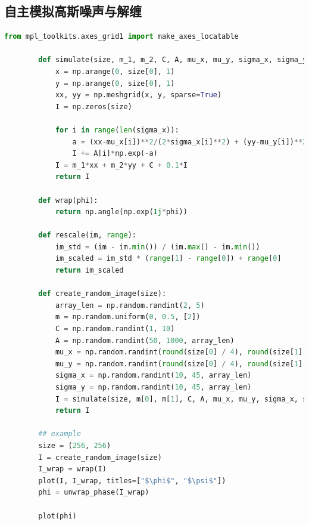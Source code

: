 \documentclass[a4paper]{article}
\begin{document}
	\subsection{自主模拟高斯噪声与解缠}
	\begin{lstlisting}[language=python,columns=fullflexible,frame=shadowbox]
		from mpl_toolkits.axes_grid1 import make_axes_locatable

		def simulate(size, m_1, m_2, C, A, mu_x, mu_y, sigma_x, sigma_y):
			x = np.arange(0, size[0], 1)
			y = np.arange(0, size[0], 1)
			xx, yy = np.meshgrid(x, y, sparse=True)
			I = np.zeros(size)
	
			for i in range(len(sigma_x)):
				a = (xx-mu_x[i])**2/(2*sigma_x[i]**2) + (yy-mu_y[i])**2/(2*sigma_y[i]**2)
				I += A[i]*np.exp(-a)
			I = m_1*xx + m_2*yy + C + 0.1*I
			return I
		
		def wrap(phi):
			return np.angle(np.exp(1j*phi))
		
		def rescale(im, range):
			im_std = (im - im.min()) / (im.max() - im.min())
			im_scaled = im_std * (range[1] - range[0]) + range[0]
			return im_scaled
		
		def create_random_image(size):
			array_len = np.random.randint(2, 5)
			m = np.random.uniform(0, 0.5, [2])
			C = np.random.randint(1, 10)
			A = np.random.randint(50, 1000, array_len)
			mu_x = np.random.randint(round(size[0] / 4), round(size[1] * 3 / 4), array_len)
			mu_y = np.random.randint(round(size[0] / 4), round(size[1] * 3 / 4), array_len)
			sigma_x = np.random.randint(10, 45, array_len)
			sigma_y = np.random.randint(10, 45, array_len)
			I = simulate(size, m[0], m[1], C, A, mu_x, mu_y, sigma_x, sigma_y)
			return I
			
		## example
		size = (256, 256)	
		I = create_random_image(size)
		I_wrap = wrap(I)
		plot(I, I_wrap, titles=["$\phi$", "$\psi$"])
		phi = unwrap_phase(I_wrap)

		plot(phi)  		
	\end{lstlisting}
\end{document}

